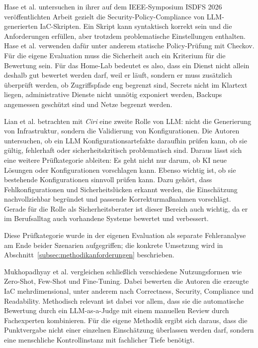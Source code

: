 Hase et al. untersuchen in ihrer auf dem IEEE-Symposium ISDFS 2026 veröffentlichten Arbeit gezielt die Security-Policy-Compliance von \ac{LLM}-generierten \acs{IaC}-Skripten. Ein Skript kann syntaktisch korrekt sein und die Anforderungen erfüllen, aber trotzdem problematische Einstellungen enthalten. Hase et al. verwenden dafür unter anderem statische Policy-Prüfung mit Checkov.\cite{hase2026securitypolicyiac} Für die eigene Evaluation muss die Sicherheit auch ein Kriterium für die Bewertung sein. Für das Home-Lab bedeutet es also, dass ein Dienst nicht allein deshalb gut bewertet werden darf, weil er läuft, sondern er muss zusätzlich überprüft werden, ob Zugriffspfade eng begrenzt sind, Secrets nicht im Klartext liegen, administrative Dienste nicht unnötig exponiert werden, Backups angemessen geschützt sind und Netze begrenzt werden.

Lian et al. betrachten mit \emph{Ciri} eine zweite Rolle von \ac{LLM}: nicht die Generierung von Infrastruktur, sondern die Validierung von Konfigurationen. Die Autoren untersuchen, ob ein \ac{LLM} Konfigurationsartefakte daraufhin prüfen kann, ob sie gültig, fehlerhaft oder sicherheitskritisch problematisch sind. \cite{lian2023ciri} Daraus lässt sich eine weitere Prüfkategorie ableiten: Es geht nicht nur darum, ob \ac{KI} neue Lösungen oder Konfigurationen vorschlagen kann. Ebenso wichtig ist, ob sie bestehende Konfigurationen sinnvoll prüfen kann. Dazu gehört, dass Fehlkonfigurationen und Sicherheitslücken erkannt werden, die Einschätzung nachvollziehbar begründet und passende Korrekturmaßnahmen vorschlägt. Gerade für die Rolle als Sicherheitsberater ist dieser Bereich auch wichtig, da er im Berufsalltag auch vorhandene Systeme bewertet und verbessert.

Diese Prüfkategorie wurde in der eigenen Evaluation als separate Fehleranalyse am Ende beider Szenarien aufgegriffen; die konkrete Umsetzung wird in Abschnitt~\ref{subsec:methodikanforderungen} beschrieben.

\label{sec:Mukhopadhyay}
Mukhopadhyay et al. vergleichen schließlich verschiedene Nutzungsformen wie Zero-Shot, Few-Shot und Fine-Tuning. Dabei bewerten die Autoren die erzeugte \ac{IaC} mehrdimensional, unter anderem nach Correctness, Security, Compliance und Readability. Methodisch relevant ist dabei vor allem, dass sie die automatische Bewertung durch ein \ac{LLM}-as-a-Judge mit einem manuellen Review durch Fachexperten kombinieren\cite{KIIaC}.
Für die eigene Methodik ergibt sich daraus, dass die Punktvergabe nicht einer einzelnen Einschätzung überlassen werden darf, sondern eine menschliche Kontrollinstanz mit fachlicher Tiefe benötigt.

